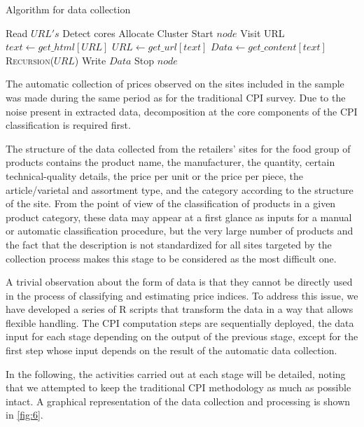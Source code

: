 \documentclass[]{article}
\begin{document}
\begin{algorithm}[h]
	\caption{Algorithm for data collection}
	\label{alg:dc}
	\begin{algorithmic}
		\State Read $URL's$
		\State Detect cores
		\State Allocate Cluster
		 \State Start $node$
		 			\State\Return
		 		\Else
		 			\State Visit URL
		 			\State $text \gets get\_html[URL]$
		 			\State $URL  \gets get\_url[text]$
		 			\State $Data \gets get\_content[text]$
		 			\State \Return \textsc{Recursion}{($URL$)}
		 		\EndIf
			\State Write $Data$
			\EndProcedure
		  \State Stop $node$
		\EndFor	
	\end{algorithmic}
\end{algorithm}





The automatic collection of prices observed on the sites included in the sample was made during
the same period as for the traditional CPI survey. Due to the noise present in extracted data, decomposition at the core components of the CPI classification is required first.


The structure of the data collected from the retailers’ sites for the food group of products contains the product 
name, the manufacturer, the quantity, certain technical-quality details, the price per unit or the price per piece, 
the article/varietal and assortment type, and the category according to the structure of the site. From the point of view 
of the classification of products in a given product category, these data may appear at a first glance 
as inputs for a manual or automatic classification procedure, but the very large number of products and the fact 
that the description is not standardized for all sites targeted by the collection process makes this stage to be considered as the most difficult one.

A trivial observation about the form of data is that they cannot be directly used in the process of classifying 
and estimating price indices. To address this issue, we have developed a series of R scripts that transform 
the data in a way that allows flexible handling. The CPI computation steps are sequentially deployed, the data 
input for each stage depending on the output of the previous stage, except for the first step whose input depends 
on the result of the automatic data collection.


In the following, the activities carried out at each stage will be detailed, noting that we attempted to keep the 
traditional CPI methodology as much as possible intact. A graphical representation of the data collection and processing is shown in \ref{fig:6}.
\end{document}
